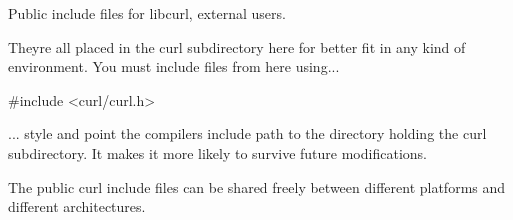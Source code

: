 Public include files for libcurl, external users.

They\textquotesingle{}re all placed in the curl subdirectory here for better fit in any kind of environment. You must include files from here using... \begin{DoxyVerb}#include <curl/curl.h>
\end{DoxyVerb}
 ... style and point the compiler\textquotesingle{}s include path to the directory holding the curl subdirectory. It makes it more likely to survive future modifications.

The public curl include files can be shared freely between different platforms and different architectures. 